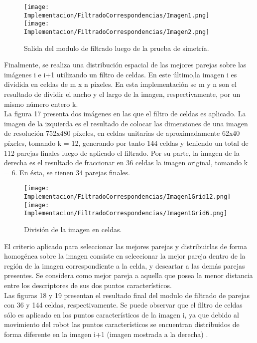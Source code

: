 \begin{figure}[H]
	
	\texttt{[image: Implementacion/FiltradoCorrespondencias/Imagen1.png]}
	\texttt{[image: Implementacion/FiltradoCorrespondencias/Imagen2.png]}
	\caption{Salida del modulo de filtrado luego de la prueba de simetría.}
	\label{fig:my_label}
\end{figure}


Finalmente, se realiza una distribución espacial de las mejores parejas  sobre las imágenes i e i+1 utilizando un filtro de celdas. En este último,la imagen i es dividida en celdas de m x n pixeles. En esta implementación se m y n son el resultado de dividir el ancho y el largo de la imagen, respectivamente, por un mismo número entero k. \\

La figura 17 presenta dos imágenes en las que el filtro de celdas es aplicado. La imagen de la izquierda es el resultado de colocar las dimensiones de una imagen de resolución 752x480 píxeles, en celdas unitarias de aproximadamente 62x40 píxeles,
tomando k = 12,  generando por tanto 144 celdas y teniendo un total de 112 parejas finales luego de aplicado el filtrado. Por su parte, la imagen de la derecha es el resultado de fraccionar en 36 celdas la imagen original, tomando k = 6. En ésta, se tienen 34 parejas finales. \\


\begin{figure}[H]
	
	\texttt{[image: Implementacion/FiltradoCorrespondencias/Imagen1Grid12.png]}
	\texttt{[image: Implementacion/FiltradoCorrespondencias/Imagen1Grid6.png]}
	\caption{División de la imagen en celdas.}
	\label{fig:my_label}
\end{figure}


El criterio aplicado para seleccionar las mejores parejas y distribuirlas de forma homogénea sobre la imagen  consiste en seleccionar la mejor pareja  dentro de la región de la imagen correspondiente a la celda, y descartar a las demás parejas presentes. Se considera como mejor pareja a aquella que posea la menor distancia entre los descriptores de sus dos puntos característicos.\\

Las figuras 18 y 19 presentan el resultado final del modulo de filtrado de parejas con 36 y 144 celdas, respectivamente. Se puede observar que el filtro de celdas sólo es aplicado en los puntos característicos de la imagen i, ya que debido al movimiento del robot las puntos característicos se encuentran distribuidos de forma diferente en la imagen i+1 (imagen mostrada a la derecha) . \\

